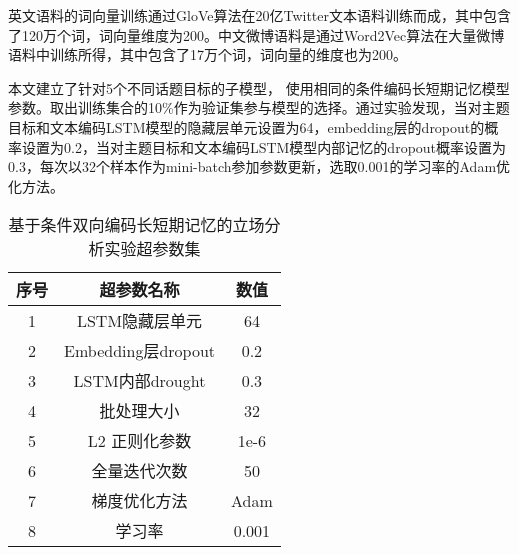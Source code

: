 英文语料的词向量训练通过GloVe算法在20亿Twitter文本语料训练而成，其中包含了120万个词，词向量维度为200。中文微博语料是通过Word2Vec算法在大量微博语料中训练所得，其中包含了17万个词，词向量的维度也为200。

本文建立了针对5个不同话题目标的子模型， 使用相同的条件编码长短期记忆模型参数。取出训练集合的10\%作为验证集参与模型的选择。通过实验发现，当对主题目标和文本编码LSTM模型的隐藏层单元设置为64，embedding层的dropout的概率设置为0.2，当对主题目标和文本编码LSTM模型内部记忆的dropout概率设置为0.3，每次以32个样本作为mini-batch参加参数更新，选取0.001的学习率的Adam优化方法。

\begin{table}[htbp]
	\caption[param]{基于条件双向编码长短期记忆的立场分析实验超参数集}
	\label{param}
	\vspace{0.5em}\centering\wuhao
	\begin{tabular}{ccc}
		\toprule[1.5pt]
		序号& 超参数名称 &数值\\
		\midrule[1pt]
		1 &LSTM隐藏层单元& 64\\
		2 &Embedding层dropout& 0.2\\
		3 &LSTM内部drought& 0.3\\
		4 &批处理大小& 32\\
		5 &L2 正则化参数 &1e-6\\
		6 &全量迭代次数& 50\\
		7 &梯度优化方法& Adam\\
		8 &学习率& 0.001\\
		\bottomrule[1.5pt]
	\end{tabular}
\end{table}

